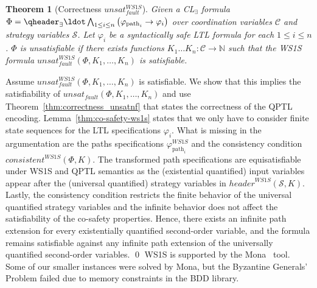\documentclass{LMCS}
\newcommand{\header}{\mathit{header}}
\newcommand{\consistent}{\mathit{consistent}}
\newcommand{\unsatnf}{\mathit{unsat}_\mathit{fault}}
\theoremstyle{plain}\newtheorem{theorem}[thm]{Theorem}
\theoremstyle{plain}\newtheorem{lemma}[thm]{Lemma}
\theoremstyle{plain}\newtheorem{proposition}[thm]{Proposition}
\theoremstyle{plain}\newtheorem{corollary}[thm]{Corollary}
\theoremstyle{definition}\newtheorem{definition}{Definition}[section]
\begin{document}
\begin{theorem}[Correctness $\unsatnf^\mathit{WS1S}$] \label{thm:correctness_ws1s_encoding}
  Given a CL$_\exists$ formula $\Phi = \qheader_\exists \ldot \bigwedge_{1 \leq i \leq n} \big( \varphi_{\text{path}_i} \allowbreak \rightarrow \varphi_i \big)$ over coordination variables $\mathcal{C}$ and strategy variables $\mathcal{S}$.
  Let $\varphi_i$ be a syntactically safe LTL formula for each $1 \leq i \leq n$.
  $\Phi$ is unsatisfiable if there exists functions $K_1 \dots K_n : \mathcal{C} \rightarrow \mathbb{N}$ such that the WS1S formula $\unsatnf^\mathit{WS1S}(\Phi,K_1,\dots,K_n)$ is satisfiable.
\end{theorem}
\proof
Assume $\unsatnf^\mathit{WS1S}(\Phi,K_1,\dots,K_n)$ is satisfiable.
We show that this implies the satisfiability of $\unsatnf(\Phi,K_1,\dots,K_n)$ and use Theorem~\ref{thm:correctness_unsatnf} that states the correctness of the QPTL encoding.
Lemma~\ref{thm:co-safety-ws1s} states that we only have to consider finite state sequences for the LTL specifications $\varphi_i$.
What is missing in the argumentation are the paths specifications $\varphi_{\text{path}_i}^\mathit{WS1S}$ and the consistency condition $\consistent^\mathit{WS1S}(\Phi,K)$.
The transformed path specifications are equisatisfiable under WS1S and QPTL semantics as the (existential quantified) input variables appear after the (universal quantified) strategy variables in $\header^\mathit{WS1S}(\mathcal{S},K)$.
Lastly, the consistency condition restricts the finite behavior of the universal quantified strategy variables and the infinite behavior does not affect the satisfiability of the co-safety properties.
Hence, there exists an infinite path extension for every existentially quantified second-order variable, and the formula remains satisfiable against any infinite path extension of the universally quantified second-order variables.
\qed\noindent
WS1S is supported by the Mona~\cite{DBLP:conf/tacas/HenriksenJJKPRS95} tool.
Some of our smaller instances were solved by Mona, but the Byzantine Generals' Problem failed due to memory constraints in the BDD library.
\end{document}
